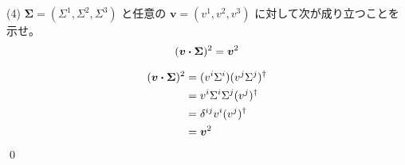 \documentclass[uplatex,dvipdfmx,a4paper,11pt]{jlreq}
\makeatletter
\theoremstyle{definition}
\renewenvironment{proof}[1][\proofname]{\par
  \normalfont
  \topsep6\p@\@plus6\p@ \trivlist
  \item[\hskip\labelsep{\bfseries #1}\@addpunct{\bfseries}]\ignorespaces\quad\par
}{%
  \qed\endtrivlist\@endpefalse
}
\renewcommand\proofname{証明}
\makeatother
\begin{document}
(4) $\bm{\Sigma} = (\Sigma^1, \Sigma^2, \Sigma^3)$ と任意の $\bm{v} = (v^1, v^2, v^3)$ に対して次が成り立つことを示せ。
\begin{align}
  (\bm{v}\vdot\bm{\Sigma})^2 = \bm{v}^2
\end{align}
\begin{proof}
  \begin{align}
    (\bm{v}\vdot\bm{\Sigma})^2 & = (v^i\Sigma^i)(v^j\Sigma^j)^\dagger \\
                               & = v^i\Sigma^i\Sigma^j(v^j)^\dagger   \\
                               & = \delta^{ij}v^i(v^j)^\dagger        \\
                               & = \bm{v}^2
  \end{align}
\end{proof}
\end{document}
